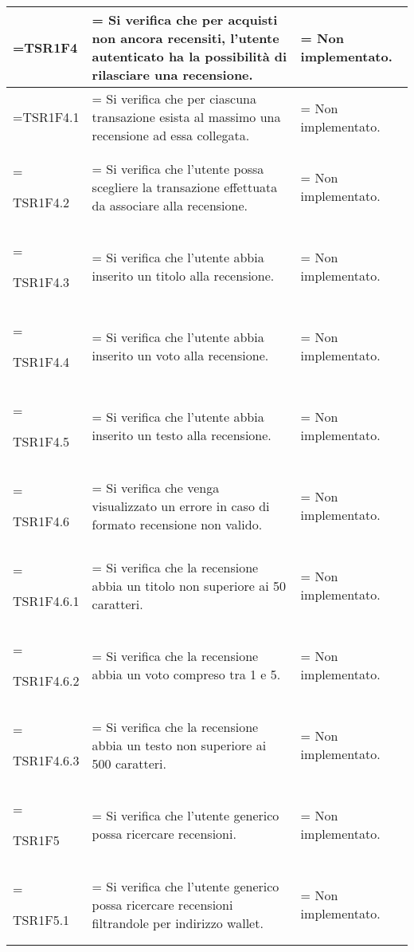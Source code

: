 \begin{xltabular}{\textwidth} {
            >{\hsize\linewidth=\hsize}X
            >{\hsize\linewidth=\hsize}X
            >{\hsize\linewidth=\hsize}X
        }
        TSR1F4&
        Si verifica che per acquisti non ancora recensiti, l'utente autenticato ha la possibilità di rilasciare una recensione.&
        Non implementato.
        \\ \hline

        TSR1F4.1&
        Si verifica che per ciascuna transazione esista al massimo una recensione ad essa collegata.&
        Non implementato.
        \\ \hline
        
        TSR1F4.2&
        Si verifica che l'utente possa scegliere la transazione effettuata da associare alla recensione.&
        Non implementato.
        \\ \hline

        TSR1F4.3&
        Si verifica che l'utente abbia inserito un titolo alla recensione.&
        Non implementato.
        \\ \hline

        TSR1F4.4&
        Si verifica che l'utente abbia inserito un voto alla recensione.&
        Non implementato.
        \\ \hline

        TSR1F4.5&
        Si verifica che l'utente abbia inserito un testo alla recensione.&
        Non implementato.
        \\ \hline

        TSR1F4.6&
        Si verifica che venga visualizzato un errore in caso di formato recensione non valido.&
        Non implementato.
        \\ \hline
        
        TSR1F4.6.1&
        Si verifica che la recensione abbia un titolo non superiore ai 50 caratteri.&
        Non implementato.
        \\ \hline

        TSR1F4.6.2&
        Si verifica che la recensione abbia un voto compreso tra 1 e 5.&
        Non implementato.
        \\ \hline

        TSR1F4.6.3&
        Si verifica che la recensione abbia un testo non superiore ai 500 caratteri.&
        Non implementato.
        \\ \hline

        TSR1F5&
        Si verifica che l'utente generico possa ricercare recensioni.&
        Non implementato.
        \\ \hline

        TSR1F5.1&
        Si verifica che l'utente generico possa ricercare recensioni filtrandole per indirizzo wallet.&
        Non implementato.
        \\ \hline
        

\end{xltabular}
